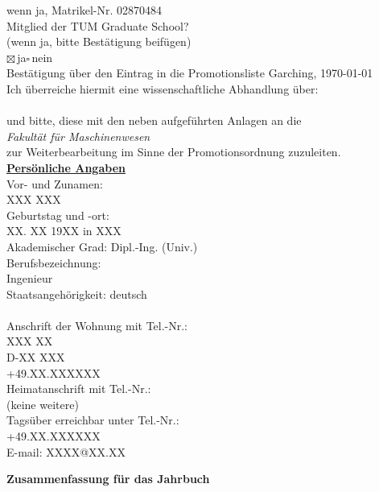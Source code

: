 \begin{multicols}{2}
      wenn ja, Matrikel-Nr.\,\,02870484\\[0.5em]
      Mitglied der TUM Graduate School?\\
     (wenn ja, bitte Bestätigung beifügen)\\
     $\boxtimes$\,ja\qquad $\square$\,nein\\[0.5em]
     Bestätigung über den Eintrag in die Promotionsliste
     \vfill\columnbreak
     Garching, \today\\[0.5em]
     Ich überreiche hiermit eine wissenschaftliche Abhandlung über:\\[1em]
     \emph{\DissTitle}\\[1em]
     und bitte, diese mit den neben aufgeführten Anlagen an die\\[1em]
     \emph{Fakult\"{a}t f\"{u}r Maschinenwesen}\\[1em]
     zur Weiterbearbeitung im Sinne der Promotionsordnung zuzuleiten.\\[1.5em]
     \underline{\textbf{Persönliche Angaben}}\\[0.5em]
     Vor- und Zunamen:\\
     XXX XXX\\[0.5em]
     Geburtstag und -ort:\\
     XX. XX 19XX in XXX\\[0.5em]
     Akademischer Grad: Dipl.-Ing. (Univ.)\\[0.5em]
     Berufsbezeichnung:\\
     Ingenieur\\[0.3em]
     Staatsangehörigkeit: deutsch\\[2em]
     \\[1.5em]
     Anschrift der Wohnung mit Tel.-Nr.:\\
     XXX XX\\
     D-XX XXX\\
     +49.XX.XXXXXX\\[0.5em]
     Heimatanschrift mit Tel.-Nr.:\\
     (keine weitere) \\[0.5em]
     Tagsüber erreichbar unter Tel.-Nr.: \\
     +49.XX.XXXXXX\\[0.5em]
     E-mail: XXXX@XX.XX
  \end{multicols}

\pagebreak
\textbf{\Large Zusammenfassung für das Jahrbuch\\[1em]}


